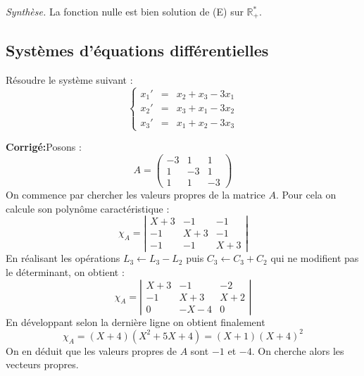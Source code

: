 \documentclass[a4paper,twoside,french,11pt]{VcCours}
\newcommand{\corr}{\textbf{Corrigé:}}
\begin{document}
\textit{Synthèse.} La fonction nulle est bien solution de (E) sur $\mathbb R_+^*$. 


\subsection{Systèmes d'équations différentielles}


\begin{Exercice}{} Résoudre le système suivant :
$$\left\{\begin{array}{rcl}
x_1' & = & x_2 + x_3 - 3x_1 \\
x_2' & = & x_3 + x_1 -3 x_2 \\
x_3' &= & x_1 + x_2 -3 x_3\end{array}\right.$$
\end{Exercice}

\corr Posons :
$$ A = \left(\begin{array}{ccc} -3 & 1 & 1 \\ 1 & -3 & 1 \\ 1 & 1 & -3 \end{array}\right)$$
On commence par chercher les valeurs propres de la matrice $A$. Pour cela on calcule son polynôme caractéristique :
$$\chi_A = \left|\begin{array}{cccc} X + 3 & -1 & -1 \\ -1 & X+3 & -1 \\ -1 & -1 & X+3 \end{array}\right|$$
En réalisant les opérations $L_3 \leftarrow L_3 - L_2$ puis $C_3 \leftarrow C_3 + C_2$ qui ne modifient pas le déterminant, on obtient :
$$\chi_A = \left|\begin{array}{cccc} X + 3 & -1 & -2 \\ -1 & X+3 & X+2 \\ 0 & -X-4 & 0 \end{array}\right|$$
En développant selon la dernière ligne on obtient finalement 
$$\chi_A = (X+4)(X^2+5X+4) = (X+1)(X+4)^2$$
On en déduit que les valeurs propres de $A$ sont $-1$ et $-4$. On cherche alors les vecteurs propres.
\end{document}
